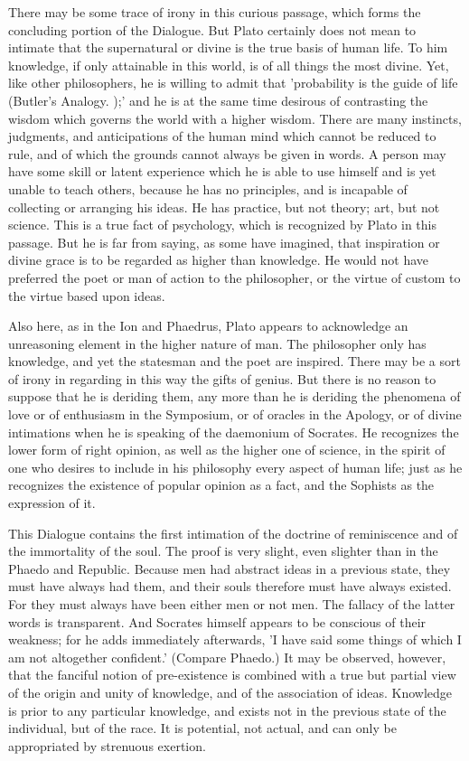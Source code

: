 \documentclass[11pt,letter]{article}
\begin{document}
\par  There may be some trace of irony in this curious passage, which forms the concluding portion of the Dialogue. But Plato certainly does not mean to intimate that the supernatural or divine is the true basis of human life. To him knowledge, if only attainable in this world, is of all things the most divine. Yet, like other philosophers, he is willing to admit that 'probability is the guide of life (Butler's Analogy. );' and he is at the same time desirous of contrasting the wisdom which governs the world with a higher wisdom. There are many instincts, judgments, and anticipations of the human mind which cannot be reduced to rule, and of which the grounds cannot always be given in words. A person may have some skill or latent experience which he is able to use himself and is yet unable to teach others, because he has no principles, and is incapable of collecting or arranging his ideas. He has practice, but not theory; art, but not science. This is a true fact of psychology, which is recognized by Plato in this passage. But he is far from saying, as some have imagined, that inspiration or divine grace is to be regarded as higher than knowledge. He would not have preferred the poet or man of action to the philosopher, or the virtue of custom to the virtue based upon ideas.

\par  Also here, as in the Ion and Phaedrus, Plato appears to acknowledge an unreasoning element in the higher nature of man. The philosopher only has knowledge, and yet the statesman and the poet are inspired. There may be a sort of irony in regarding in this way the gifts of genius. But there is no reason to suppose that he is deriding them, any more than he is deriding the phenomena of love or of enthusiasm in the Symposium, or of oracles in the Apology, or of divine intimations when he is speaking of the daemonium of Socrates. He recognizes the lower form of right opinion, as well as the higher one of science, in the spirit of one who desires to include in his philosophy every aspect of human life; just as he recognizes the existence of popular opinion as a fact, and the Sophists as the expression of it.

\par  This Dialogue contains the first intimation of the doctrine of reminiscence and of the immortality of the soul. The proof is very slight, even slighter than in the Phaedo and Republic. Because men had abstract ideas in a previous state, they must have always had them, and their souls therefore must have always existed. For they must always have been either men or not men. The fallacy of the latter words is transparent. And Socrates himself appears to be conscious of their weakness; for he adds immediately afterwards, 'I have said some things of which I am not altogether confident.' (Compare Phaedo.) It may be observed, however, that the fanciful notion of pre-existence is combined with a true but partial view of the origin and unity of knowledge, and of the association of ideas. Knowledge is prior to any particular knowledge, and exists not in the previous state of the individual, but of the race. It is potential, not actual, and can only be appropriated by strenuous exertion.
\end{document}
